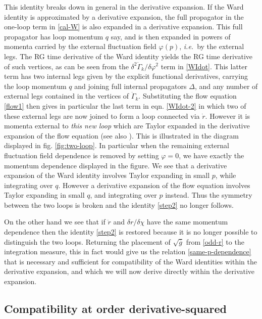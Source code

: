 \documentclass[11pt]{book} %
\newcommand\ie{\textit{i.e.}\ }
\begin{document}
This identity breaks down in general in the derivative expansion.
If the Ward identity is approximated by a derivative expansion,
the full propagator in the one-loop term in \eqref{cal-W} is also expanded in a derivative expansion.
This full propagator has loop momentum $q$ say,
and is then expanded in powers of momenta carried by the external fluctuation
field $\varphi(p)$, \ie by the external legs.
The RG time derivative of the Ward identity yields the RG time derivative of such vertices,
as can be seen from the $\delta^2\dot{\Gamma}_k/\delta\varphi^2$ term  in \eqref{WIdot}.
This latter term has two internal legs given by the explicit functional derivatives,
carrying the loop momentum $q$ and joining full internal propagators $\Delta$,
and any number of external legs contained in the vertices of $\dot{\Gamma}_k$.
Substituting the flow equation \eqref{flow1} then gives in particular the last term in
eqn. \eqref{WIdot-2} in which two of these external legs are now joined to form a loop
connected via $\dot{r}$.  However it is momenta external to \emph{this new loop} which are
Taylor expanded in the derivative expansion of the flow equation
(see also \cite{Morris:1999ba, Morris:2000hm}).
This is illustrated in the diagram displayed in fig. \ref{fig:two-loop}.
In particular when the remaining external fluctuation field dependence is removed by setting $\varphi=0$,
we have exactly the momentum dependence displayed in the figure.
We see that a derivative expansion of the Ward identity involves Taylor expanding in small $p$,
while integrating over $q$.
However a derivative expansion of the flow equation involves Taylor expanding in small $q$,
and integrating over $p$ instead.
Thus the symmetry between the two loops is broken and the identity \eqref{step2} no longer follows.

On the other hand we see that if $\dot{r}$ and $\delta r/\delta\chi$ have the same momentum
dependence then the identity \eqref{step2} is restored because it is no longer possible
to distinguish the two loops.
Returning the placement of $\sqrt{\bar{g}}$ from \eqref{odd-r} to the integration measure,
this in fact would give us the relation \eqref{same-p-dependence} that is necessary and
sufficient for compatibility of the Ward identities within the derivative expansion,
and which we will now derive directly within the derivative expansion.


\subsection{Compatibility at order derivative-squared}\label{sec:compatibility-at-d2}
\end{document}

